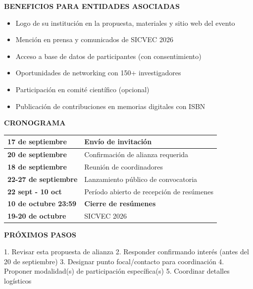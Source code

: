 \documentclass[12pt,a4paper]{article}
\begin{document}
\vspace{0.5cm}

\noindent
\textbf{BENEFICIOS PARA ENTIDADES ASOCIADAS}

\begin{itemize}
  \item Logo de su institución en la propuesta, materiales y sitio web del evento
  \item Mención en prensa y comunicados de SICVEC 2026
  \item Acceso a base de datos de participantes (con consentimiento)
  \item Oportunidades de networking con 150+ investigadores
  \item Participación en comité científico (opcional)
  \item Publicación de contribuciones en memorias digitales con ISBN
\end{itemize}

\vspace{0.5cm}

\noindent
\textbf{CRONOGRAMA}

\begin{tabular}{|l|l|}
\hline
\textbf{17 de septiembre} & Envío de invitación \\
\hline
\textbf{20 de septiembre} & Confirmación de alianza requerida \\
\hline
\textbf{18 de septiembre} & Reunión de coordinadores \\
\hline
\textbf{22-27 de septiembre} & Lanzamiento público de convocatoria \\
\hline
\textbf{22 sept - 10 oct} & Período abierto de recepción de resúmenes \\
\hline
\textbf{10 de octubre 23:59} & \textbf{Cierre de resúmenes} \\
\hline
\textbf{19-20 de octubre} & SICVEC 2026 \\
\hline
\end{tabular}

\vspace{0.8cm}

\noindent
\textbf{PRÓXIMOS PASOS}

1. Revisar esta propuesta de alianza
2. Responder confirmando interés (antes del 20 de septiembre)
3. Designar punto focal/contacto para coordinación
4. Proponer modalidad(s) de participación específica(s)
5. Coordinar detalles logísticos

\vspace{0.8cm}
\end{document}
